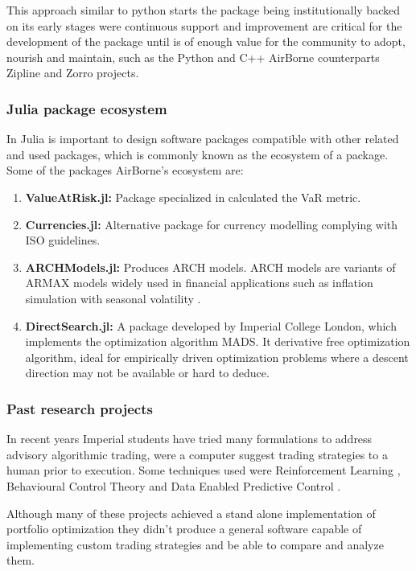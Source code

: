 This approach similar to python starts the package being institutionally backed on its early stages were continuous support and improvement are critical for the development of the package until is of enough value for the community to adopt, nourish and maintain, such as the Python and C++ AirBorne counterparts Zipline and Zorro projects.


\subsubsection{Julia package ecosystem}
In Julia is important to design software packages compatible with other related and used packages, which is commonly known as the ecosystem of a package. Some of the packages AirBorne's ecosystem are:
\begin{enumerate}
    \item \textbf{ValueAtRisk.jl:} Package specialized in calculated the \ac{VaR} metric.
    \item \textbf{Currencies.jl:} Alternative package for currency modelling complying with ISO guidelines.
    \item \textbf{ARCHModels.jl:} Produces ARCH models. ARCH models are variants of ARMAX models widely used in financial applications such as inflation simulation with seasonal volatility \cite{ARCHModels.jl,Periodic_ARCHModels_og_paper,ARCHModels_og_paper}.
    \item \textbf{DirectSearch.jl: } A package developed by Imperial College London, which implements the optimization algorithm \ac{MADS}\cite{DirectSearch.jl,MADS_og_paper_06}. It  derivative free optimization algorithm, ideal for empirically driven optimization problems where a descent direction may not be available or hard to deduce.
\end{enumerate}

\subsubsection{Past research projects}

In recent years Imperial students have tried many formulations to address advisory algorithmic trading, were a computer suggest trading strategies to a human prior to execution. Some techniques used were Reinforcement Learning  \cite{RLMasoud2021}, Behavioural Control Theory  \cite{BCTScott2022,BCTKhaliq2022} and Data Enabled Predictive Control \cite{DeePCMohamed2023}.

Although many of these projects achieved a stand alone implementation of portfolio optimization they didn't produce a general software capable of implementing custom trading strategies and be able to compare and analyze them. 

